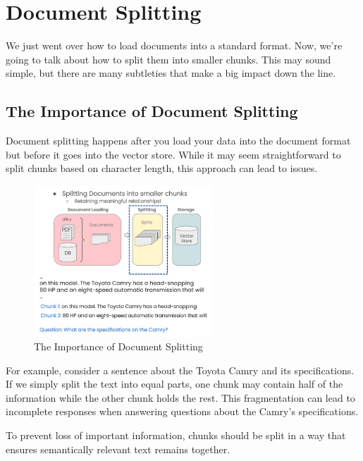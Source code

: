 \documentclass{article}
\begin{document}
\section{Document Splitting}

We just went over how to load documents into a standard format. Now, we’re going to talk about how to split them into smaller chunks. This may sound simple, but there are many subtleties that make a big impact down the line.

\subsection{The Importance of Document Splitting}

Document splitting happens after you load your data into the document format but before it goes into the vector store. While it may seem straightforward to split chunks based on character length, this approach can lead to issues.

\begin{figure}[H]
    \centering
    \includegraphics[width=0.6\textwidth]{images/langchain_chat_with_your_data_005.png}
    \caption{The Importance of Document Splitting}
    \label{fig:the_importance_of_document_splitting}
\end{figure}

For example, consider a sentence about the Toyota Camry and its specifications. If we simply split the text into equal parts, one chunk may contain half of the information while the other chunk holds the rest. This fragmentation can lead to incomplete responses when answering questions about the Camry’s specifications.

To prevent loss of important information, chunks should be split in a way that ensures semantically relevant text remains together.
\end{document}
